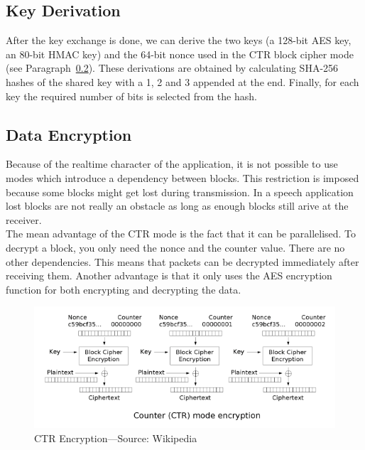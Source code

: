 \documentclass[a4paper]{article}
\begin{document}
\subsection{Key Derivation}
\label{par:key_derivation}

After the key exchange is done, we can derive the two keys (a 128-bit AES key, an 80-bit HMAC key) and the 64-bit nonce used in the CTR block cipher mode (see Paragraph~\ref{par:data_encryption}). These derivations are obtained by calculating SHA-256 hashes of the shared key with a 1, 2 and 3 appended at the end. Finally, for each key the required number of bits is selected from the hash.

\subsection{Data Encryption}
\label{par:data_encryption}

Because of the realtime character of the application, it is not possible to use modes which introduce a dependency between blocks. This restriction is imposed because some blocks might get lost during transmission. In a speech application lost blocks are not really an obstacle as long as enough blocks still arive at the receiver.\\

The mean advantage of the CTR mode is the fact that it can be parallelised. To decrypt a block, you only need the nonce and the counter value. There are no other dependencies. This means that packets can be decrypted immediately after receiving them. Another advantage is that it only uses the AES encryption function for both encrypting and decrypting the data.

\begin{figure}[h]
    \centering
    \includegraphics[scale=0.75]{ctr_encryption.png}
    \caption{CTR Encryption---Source: Wikipedia}
    \label{fig:ctr_encryption}
\end{figure}
\end{document}

